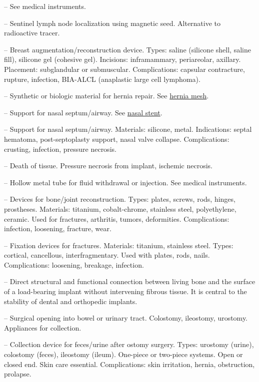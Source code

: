 -- See medical instruments.

-- Sentinel lymph node localization using magnetic seed. Alternative to radioactive tracer.


-- Breast augmentation/reconstruction device. Types: saline (silicone shell, saline fill), silicone gel (cohesive gel). Incisions: inframammary, periareolar, axillary. Placement: subglandular or submuscular. Complications: capsular contracture, rupture, infection, BIA-ALCL (anaplastic large cell lymphoma).

-- Synthetic or biologic material for hernia repair. See \hyperlink{Hernia Mesh}{hernia mesh}.

-- Support for nasal septum/airway. See \hyperlink{Nasal Stent}{nasal stent}.

-- Support for nasal septum/airway. Materials: silicone, metal. Indications: septal hematoma, post-septoplasty support, nasal valve collapse. Complications: crusting, infection, pressure necrosis.

-- Death of tissue. Pressure necrosis from implant, ischemic necrosis.


-- Hollow metal tube for fluid withdrawal or injection. See medical instruments.

-- Devices for bone/joint reconstruction. Types: plates, screws, rods, hinges, prostheses. Materials: titanium, cobalt-chrome, stainless steel, polyethylene, ceramic. Used for fractures, arthritis, tumors, deformities. Complications: infection, loosening, fracture, wear.

-- Fixation devices for fractures. Materials: titanium, stainless steel. Types: cortical, cancellous, interfragmentary. Used with plates, rods, nails. Complications: loosening, breakage, infection.


-- Direct structural and functional connection between living bone and the surface of a load-bearing implant without intervening fibrous tissue. It is central to the stability of dental and orthopedic implants.

-- Surgical opening into bowel or urinary tract. Colostomy, ileostomy, urostomy. Appliances for collection.

-- Collection device for feces/urine after ostomy surgery. Types: urostomy (urine), colostomy (feces), ileostomy (ileum). One-piece or two-piece systems. Open or closed end. Skin care essential. Complications: skin irritation, hernia, obstruction, prolapse.


